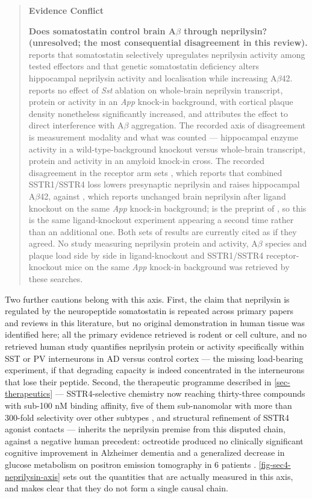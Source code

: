 \documentclass[11pt]{article}
\begin{document}
\begin{quote}
\noindent\textbf{Evidence Conflict}\par
\textbf{Does somatostatin control brain A$\beta$ through neprilysin? (unresolved; the most consequential disagreement in this review).} \citet{Saito2005} reports that somatostatin selectively upregulates neprilysin activity among tested effectors and that genetic somatostatin deficiency alters hippocampal neprilysin activity and localisation while increasing A$\beta$42. \citet{Williams2023} reports no effect of \emph{Sst} ablation on whole-brain neprilysin transcript, protein or activity in an \emph{App} knock-in background, with cortical plaque density nonetheless significantly increased, and attributes the effect to direct interference with A$\beta$ aggregation. The recorded axis of disagreement is measurement modality and what was counted --- hippocampal enzyme activity in a wild-type-background knockout versus whole-brain transcript, protein and activity in an amyloid knock-in cross. The recorded disagreement in the receptor arm sets \citet{Nilsson2020}, which reports that combined SSTR1/SSTR4 loss lowers presynaptic neprilysin and raises hippocampal A$\beta$42, against \citet{Williams2022}, which reports unchanged brain neprilysin after ligand knockout on the same \emph{App} knock-in background; \citet{Williams2022} is the preprint of \citet{Williams2023}, so this is the same ligand-knockout experiment appearing a second time rather than an additional one. Both sets of results are currently cited as if they agreed. No study measuring neprilysin protein and activity, A$\beta$ species and plaque load side by side in ligand-knockout and SSTR1/SSTR4 receptor-knockout mice on the same \emph{App} knock-in background was retrieved by these searches.

\end{quote}

Two further cautions belong with this axis. First, the claim that neprilysin is regulated by the neuropeptide somatostatin is repeated across primary papers and reviews in this literature, but no original demonstration in human tissue was identified here; all the primary evidence retrieved is rodent or cell culture, and no retrieved human study quantifies neprilysin protein or activity specifically within SST or PV interneurons in AD versus control cortex --- the missing load-bearing experiment, if that degrading capacity is indeed concentrated in the interneurons that lose their peptide. Second, the therapeutic programme described in \ref{sec-therapeutics} --- SSTR4-selective chemistry now reaching thirty-three compounds with sub-100 nM binding affinity, five of them sub-nanomolar with more than 300-fold selectivity over other subtypes \citep{Crider2025}, and structural refinement of SSTR4 agonist contacts \citep{Slater2025} --- inherits the neprilysin premise from this disputed chain, against a negative human precedent: octreotide produced no clinically significant cognitive improvement in Alzheimer dementia and a generalized decrease in glucose metabolism on positron emission tomography in 6 patients \citep{Mouradian1991}. \ref{fig-sec4-neprilysin-axis} sets out the quantities that are actually measured in this axis, and makes clear that they do not form a single causal chain.
\end{document}

